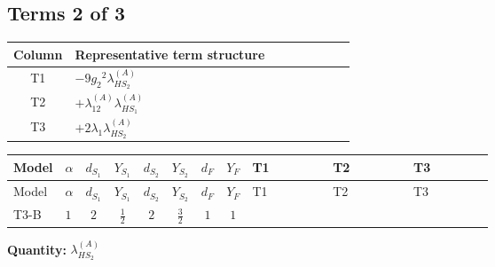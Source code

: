 \documentclass[8pt]{article}
\begin{document}
\begin{landscape}
\subsection*{Terms 2 of 3}
\begin{center}
\begin{tabular}{@{}c >{\raggedright\arraybackslash}p{0.82\linewidth}@{}}
\toprule
Column & Representative term structure \\
\midrule
T1 & \(\displaystyle -9 {g_2}^2 {\lambda_{HS_2}^{(A)}}\) \\
\midrule
T2 & \(\displaystyle +{\lambda_{12}^{(A)}} {\lambda_{HS_1}^{(A)}}\) \\
\midrule
T3 & \(\displaystyle +2 {\lambda_1} {\lambda_{HS_2}^{(A)}}\) \\
\midrule
\bottomrule
\end{tabular}
\end{center}
\smallskip
\tiny
\begin{longtable}{@{}llcccccc >{\raggedright\arraybackslash}p{0.21\linewidth} >{\raggedright\arraybackslash}p{0.21\linewidth} >{\raggedright\arraybackslash}p{0.21\linewidth}@{}}
\toprule
Model & $\alpha$ & $d_{S_1}$ & $Y_{S_1}$ & $d_{S_2}$ & $Y_{S_2}$ & $d_F$ & $Y_F$ & T1 & T2 & T3 \\
\midrule
\endfirsthead
\toprule
Model & $\alpha$ & $d_{S_1}$ & $Y_{S_1}$ & $d_{S_2}$ & $Y_{S_2}$ & $d_F$ & $Y_F$ & T1 & T2 & T3 \\
\midrule
\endhead
T3-B & $1$ & $2$ & $\frac{1}{2}$ & $2$ & $\frac{3}{2}$ & $1$ & $1$ & \scriptsize\adjustbox{max width=\linewidth}{$\begin{gathered} -9 {g_2}^2 {\lambda_{HS_2}^{(A)}}\end{gathered}$} & \scriptsize\adjustbox{max width=\linewidth}{$\begin{gathered} +{\lambda_{12}^{(A)}} {\lambda_{HS_1}^{(A)}}\end{gathered}$} & \scriptsize\adjustbox{max width=\linewidth}{$\begin{gathered} +2 {\lambda_1} {\lambda_{HS_2}^{(A)}}\end{gathered}$} \\
\midrule
\bottomrule
\end{longtable}
\clearpage
\noindent\textbf{Quantity: }$\lambda_{HS_2}^{(A)}$\par\smallskip

\end{landscape}
\end{document}
